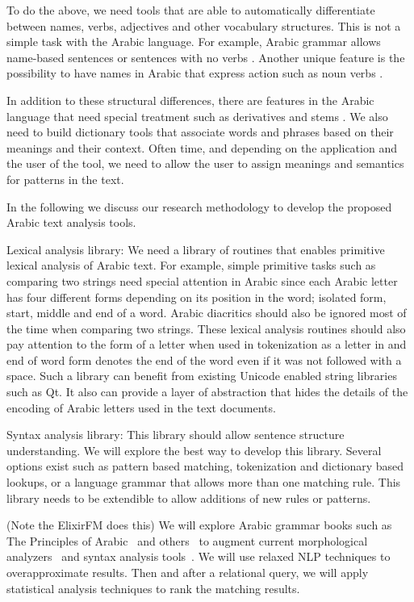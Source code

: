 \documentclass[12pt]{article}
\newcommand{\noTrNoVocRL}[1]{\novocalize\transfalse\RL{#1}\transtrue\vocalize}
\begin{document}
To do the above,
 we need tools that are able to automatically differentiate between names,
 verbs,
 adjectives and other vocabulary structures.
 This is not a simple task with the Arabic language.
 For example,
 Arabic grammar allows name-based sentences or sentences with no 
    verbs \noTrNoVocRL{^gml ismiyT} .
 Another unique feature is the possibility to have names in Arabic 
 that express action such as noun verbs 
 \noTrNoVocRL{ism f`l, f-a`l $\ldots$}.

 In addition to these structural differences,
 there are features in the Arabic language that need special 
 treatment such as derivatives and stems 
 \noTrNoVocRL{alm^staq-at w al^g_dwr}.
 We also need to build dictionary tools that associate words and phrases based on their meanings and their context.
 Often time,
 and depending on the application and the user of the tool,
 we need to allow the user to assign meanings and semantics for patterns in the text.

In the following we discuss our research methodology to develop the proposed Arabic text analysis tools.
 
Lexical analysis library: We need a library of routines that enables primitive lexical analysis of Arabic text.
 For example,
 simple primitive tasks such as comparing two strings need special attention in Arabic since each Arabic letter has four different forms depending on its position in the word; isolated form,
 start,
 middle and end of a word.
 Arabic diacritics should also be ignored most of the time when comparing two strings.
 These lexical analysis routines should also pay attention to the form of a letter when used in tokenization as a letter in and end of word form denotes the end of the word even if it was not followed with a space.
 Such a library can benefit from existing Unicode enabled string libraries such as Qt.
 It also can provide a layer of abstraction that hides the details of the encoding of Arabic letters used in the text documents.
 
Syntax analysis library: This library should allow sentence structure understanding.
 We will explore the best way to develop this library.
 Several options exist such as pattern based matching,
 tokenization and dictionary based lookups,
 or a language grammar that allows more than one matching rule.
 This library needs to be extendible to allow additions of new rules or patterns.

 (Note the ElixirFM does this)
 We will explore Arabic grammar books such as The Principles of Arabic~\cite{Sha73} and others~\cite{Abd00,Abd001}
 to augment current morphological analyzers~\cite{Tim04} and syntax analysis tools~\cite{Col09}.
 We will use relaxed NLP techniques to overapproximate results.
 Then and after a relational query,
 we will apply statistical analysis techniques to rank the matching results.
\end{document}
